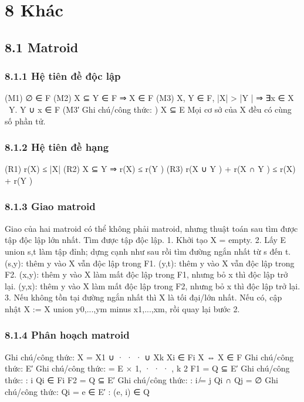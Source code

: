 \documentclass[11pt]{article}
\begin{document}
\section{8 Khác}
\subsection{8.1 Matroid}
\subsubsection{8.1.1 Hệ tiên đề độc lập}
\begin{NoteBlock}
(M1) ∅ ∈ F
(M2) X ⊆ Y ∈ F ⇒ X ∈ F
(M3) X, Y ∈ F, |X| > |Y | ⇒ ∃x ∈ X \ Y. Y ∪ {x} ∈ F
(M3′
Ghi chú/công thức: )   X ⊆ E
Mọi cơ sở của X đều có cùng số phần tử.
\end{NoteBlock}
\subsubsection{8.1.2 Hệ tiên đề hạng}
\begin{NoteBlock}
(R1) r(X) ≤ |X|
(R2) X ⊆ Y ⇒ r(X) ≤ r(Y )
(R3) r(X ∪ Y ) + r(X ∩ Y ) ≤ r(X) + r(Y )
\end{NoteBlock}
\subsubsection{8.1.3 Giao matroid}
\begin{NoteBlock}
Giao của hai matroid có thể không phải matroid, nhưng thuật toán sau tìm được tập độc lập lớn nhất.
Tìm được tập độc lập.
1. Khởi tạo X = empty.
2. Lấy E union {s,t} làm tập đỉnh; dựng cạnh như sau rồi tìm đường ngắn nhất từ s đến t.
(s,y): thêm y vào X vẫn độc lập trong F1.
(y,t): thêm y vào X vẫn độc lập trong F2.
(x,y): thêm y vào X làm mất độc lập trong F1, nhưng
bỏ x thì độc lập trở lại.
(y,x): thêm y vào X làm mất độc lập trong F2, nhưng
bỏ x thì độc lập trở lại.
3. Nếu không tồn tại đường ngắn nhất thì X là tối đại/lớn nhất.
Nếu có, cập nhật X := X union {y0,...,ym} minus {x1,...,xm}, rồi quay lại bước 2.
\end{NoteBlock}
\subsubsection{8.1.4 Phân hoạch matroid}
\begin{NoteBlock}
Ghi chú/công thức: X = X1 ∪ · · · ∪ Xk  Xi ∈ Fi  X   ⇔ X ∈ F
Ghi chú/công thức: E′
Ghi chú/công thức: = E × {1, · · · , k}   2
F1 = {Q ⊆ E′
Ghi chú/công thức: :   i   Qi ∈ Fi}
F2 = {Q ⊆ E′
Ghi chú/công thức: :   i ̸= j   Qi ∩ Qj = ∅}
Ghi chú/công thức: Qi = {e ∈ E′
: (e, i) ∈ Q}
\end{NoteBlock}
\end{document}
